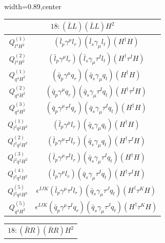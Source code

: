 \begin{table}[H]
\begin{center}
\begin{adjustbox}{width=0.89\textwidth,center}
\small
\begin{minipage}[t]{6.4cm}
\renewcommand{\arraystretch}{1.5}
\begin{tabular}[t]{c|c}
\multicolumn{2}{c}{\boldmath$18:(\bar L L)(\bar L L)H^2$} \\
\hline
$Q_{l^4H^2}^{(1)}$  &  $(\bar l_p \gamma^\mu l_r) (\bar l_s \gamma_\mu l_t) (H^\dag H)$ \\
%
$Q_{l^4H^2}^{(2)}$  &  $(\bar l_p \gamma^\mu l_r) (\bar l_s \gamma_\mu \tau^I l_t) (H^\dag \tau^I H)$ \\
%
$Q_{q^4H^2}^{(1)}$  & $(\bar q_p \gamma^\mu q_r) (\bar q_s \gamma_\mu q_t) (H^\dag H)$ \\
%
$Q_{q^4H^2}^{(2)}$  & $(\bar q_p \gamma^\mu q_r) (\bar q_s \gamma_\mu \tau^I q_t) (H^\dag \tau^I H)$ \\
%
$Q_{q^4H^2}^{(3)}$  & $(\bar q_p \gamma^\mu \tau^I q_r) (\bar q_s \gamma_\mu \tau^I q_t) (H^\dag H)$ \\
%
$Q_{l^2q^2H^2}^{(1)}$  & $(\bar l_p \gamma^\mu l_r) (\bar q_s \gamma_\mu q_t) (H^\dag H)$ \\
%
$Q_{l^2q^2H^2}^{(2)}$  & $(\bar l_p \gamma^\mu \tau^I l_r) (\bar q_s \gamma_\mu q_t) (H^\dag \tau^I H)$ \\
%
$Q_{l^2q^2H^2}^{(3)}$  & $(\bar l_p \gamma^\mu \tau^I l_r) (\bar q_s \gamma_\mu \tau^I q_t) (H^\dag H)$ \\
%
$Q_{l^2q^2H^2}^{(4)}$  & $(\bar l_p \gamma^\mu l_r) (\bar q_s \gamma_\mu \tau^I q_t) (H^\dag \tau^I H)$ \\
%
$Q_{l^2q^2H^2}^{(5)}$  & $\epsilon^{IJK} (\bar l_p \gamma^\mu \tau^I l_r) (\bar q_s \gamma_\mu \tau^J q_t) (H^\dag \tau^K H)$ \\ \hdashline
%
$Q_{q^4H^2}^{(5)}$  & $\epsilon^{IJK} (\bar q_p \gamma^\mu \tau^I q_r) (\bar q_s \gamma_\mu \tau^J q_t) (H^\dag \tau^K H)$
\end{tabular}
\end{minipage}
\hspace{1cm}
\begin{minipage}[t]{5.9cm}
\renewcommand{\arraystretch}{1.5}
\begin{tabular}[t]{c|c}
\multicolumn{2}{c}{\boldmath$18:(\bar R R)(\bar R R)H^2$} \\

\end{tabular}
\end{minipage}
\end{adjustbox}
\end{center}
\end{table}

